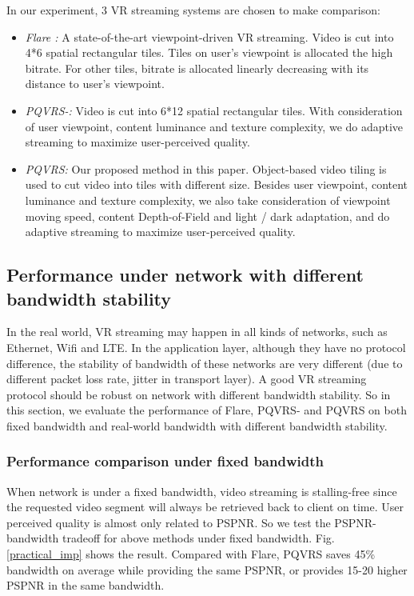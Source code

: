 In our experiment, 3 VR streaming systems are chosen to make comparison:

\begin{itemize}

\item \emph{Flare \cite{Flare}:} A state-of-the-art viewpoint-driven VR streaming. Video is cut into 4*6 spatial rectangular tiles. Tiles on user's viewpoint is allocated the high bitrate. For other tiles, bitrate is allocated linearly decreasing with its distance to user's viewpoint.

\item \emph{PQVRS-:} Video is cut into 6*12 spatial rectangular tiles. With consideration of user viewpoint, content luminance and texture complexity, we do adaptive streaming to maximize user-perceived quality.

\item \emph{PQVRS:} Our proposed method in this paper. Object-based video tiling is used to cut video into tiles with different size. Besides user viewpoint, content luminance and texture complexity, we also take consideration of viewpoint moving speed, content Depth-of-Field and light / dark adaptation, and do adaptive streaming to maximize user-perceived quality.

\end{itemize}

\subsection{Performance under network with different bandwidth stability}

In the real world, VR streaming may happen in all kinds of networks, such as Ethernet, Wifi and LTE. In the application layer, although they have no protocol difference, the stability of bandwidth of these networks are very different (due to different packet loss rate, jitter in transport layer). A good VR streaming protocol should be robust on network with different bandwidth stability. So in this section, we evaluate the performance of Flare, PQVRS- and PQVRS on both fixed bandwidth and real-world bandwidth with different bandwidth stability.

\subsubsection{Performance comparison under fixed bandwidth}

When network is under a fixed bandwidth, video streaming is stalling-free since the requested video segment will always be retrieved back to client on time. User perceived quality is almost only related to PSPNR. So we test the PSPNR-bandwidth tradeoff for above methods under fixed bandwidth. Fig. \ref{practical_imp} shows the result. Compared with Flare, PQVRS saves 45\% bandwidth on average while providing the same PSPNR, or provides 15-20 higher PSPNR in the same bandwidth.

